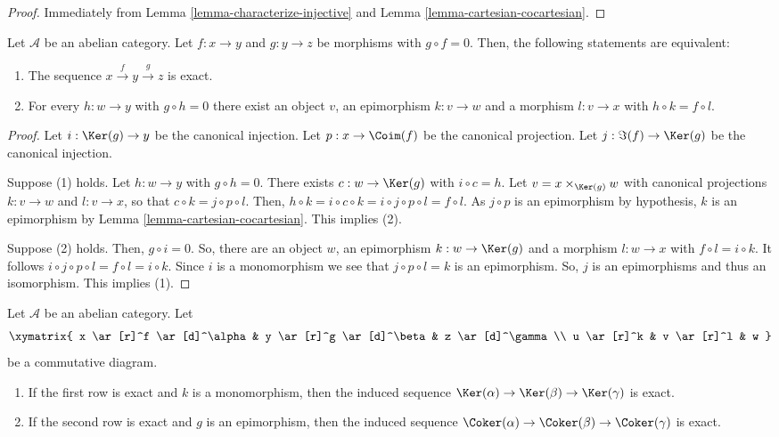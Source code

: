 \begin{proof}
Immediately from Lemma \ref{lemma-characterize-injective} and
Lemma \ref{lemma-cartesian-cocartesian}.
\end{proof}

\begin{lemma}
\label{lemma-check-exactness-fibre-product}
Let $\mathcal{A}$ be an abelian category. Let $f:x\to y$ and $g:y\to z$ 
be morphisms with $g\circ f=0$. Then, the following statements are equivalent:
\begin{enumerate}
\item The sequence $x\overset{f}\to y\overset{g}\to z$ is exact.
\item For every $h:w\to y$ with $g\circ h=0$ there exist an object $v$, 
an epimorphism $k:v\to w$ and a morphism $l:v\to x$ with $h\circ k=f\circ l$.
\end{enumerate}
\end{lemma}

\begin{proof}
Let $i:\Ker(g)\to y$ be the canonical injection. Let 
$p:x\to\Coim(f)$ be the canonical projection. Let 
$j:\Im(f)\to\Ker(g)$ be the canonical injection.

\medskip\noindent
Suppose (1) holds. Let $h:w\to y$ with $g\circ h=0$. There exists 
$c:w\to\Ker(g)$ with $i\circ c=h$. 
Let $v=x\times_{\Ker(g)}w$ with canonical projections 
$k:v\to w$ and $l:v\to x$, so that $c\circ k=j\circ p\circ l$. 
Then, $h\circ k=i\circ c\circ k=i\circ j\circ p\circ l=f\circ l$. 
As $j\circ p$ is an epimorphism by hypothesis, $k$ is an 
epimorphism by Lemma \ref{lemma-cartesian-cocartesian}. This implies (2).

\medskip\noindent
Suppose (2) holds. Then, $g\circ i=0$. So, there are an object 
$w$, an epimorphism $k:w\to\Ker(g)$ and a morphism 
$l:w\to x$ with $f\circ l=i\circ k$. It follows 
$i\circ j\circ p\circ l=f\circ l=i\circ k$. Since $i$ is a 
monomorphism we see that $j\circ p\circ l=k$ is an epimorphism. 
So, $j$ is an epimorphisms and thus an isomorphism. This implies (1).
\end{proof}

\begin{lemma}
\label{lemma-exact-kernel-sequence}
Let $\mathcal{A}$ be an abelian category. Let
$$
\xymatrix{
x \ar[r]^f \ar[d]^\alpha &
y \ar[r]^g \ar[d]^\beta &
z \ar[d]^\gamma\\
u \ar[r]^k & v \ar[r]^l & w
}
$$
be a commutative diagram.
\begin{enumerate}
\item If the first row is exact and $k$ is a monomorphism, then the induced 
sequence $\Ker(\alpha) \to \Ker(\beta) \to \Ker(\gamma)$ 
is exact.
\item If the second row is exact and $g$ is an epimorphism, then the induced 
sequence
$\Coker(\alpha) \to \Coker(\beta) \to \Coker(\gamma)$ 
is exact.
\end{enumerate}
\end{lemma}

